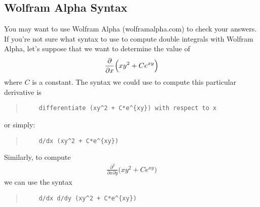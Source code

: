 \setcounter{subsection}{-1}

\subsection{Wolfram Alpha Syntax}
You may want to use Wolfram Alpha (wolframalpha.com) to check your answers. If you're not sure what syntax to use to compute double integrals with Wolfram Alpha, let's suppose that we want to determine the value of
\begin{align*} 
   \frac{\partial}{\partial x} \Big( xy^2 + Ce^{xy}\Big)
\end{align*}
where $C$ is a constant. The syntax we could use to compute this particular derivative is
\begin{quote}
  \begin{verbatim}
    differentiate (xy^2 + C*e^{xy}) with respect to x
  \end{verbatim}
\end{quote}
or simply:
\begin{quote}
  \begin{verbatim}
    d/dx (xy^2 + C*e^{xy}) 
  \end{verbatim}
\end{quote}
Similarly, to compute 
\begin{align*} 
   \frac{\partial^2}{\partial x \partial y} \Big( xy^2 + Ce^{xy}\Big)
\end{align*}
we can use the syntax
\begin{quote}
  \begin{verbatim}
    d/dx d/dy (xy^2 + C*e^{xy}) 
  \end{verbatim}
\end{quote}